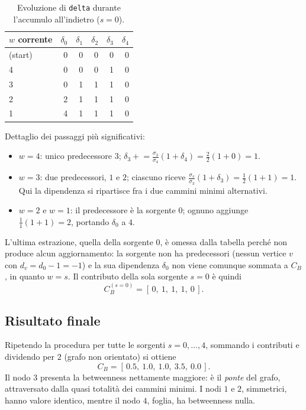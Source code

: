 \documentclass[11pt,a4paper]{report}
\begin{document}
\begin{table}[H]
	\centering
	\caption{Evoluzione di \texttt{delta} durante l'accumulo all'indietro ($s=0$).}
	\begin{tabular}{l rrrrr}
		\toprule
		$w$ corrente & $\delta_0$ & $\delta_1$ & $\delta_2$ & $\delta_3$ & $\delta_4$ \\
		\midrule
		(start)      & 0          & 0          & 0          & 0          & 0          \\
		4            & 0          & 0          & 0          & 1          & 0          \\
		3            & 0          & 1          & 1          & 1          & 0          \\
		2            & 2          & 1          & 1          & 1          & 0          \\
		1            & 4          & 1          & 1          & 1          & 0          \\
		\bottomrule
	\end{tabular}
\end{table}

Dettaglio dei passaggi più significativi:
\begin{itemize}
	\item \textbf{$w=4$}: unico predecessore $3$; $\delta_3 \mathrel{+}=
		      \frac{\sigma_3}{\sigma_4}(1+\delta_4)=\frac{2}{2}(1+0)=1$.
	\item \textbf{$w=3$}: due predecessori, $1$ e $2$; ciascuno riceve
	      $\frac{\sigma_v}{\sigma_3}(1+\delta_3)=\frac{1}{2}(1+1)=1$. Qui la
	      dipendenza si ripartisce fra i due cammini minimi alternativi.
	\item \textbf{$w=2$} e \textbf{$w=1$}: il predecessore è la sorgente $0$;
	      ognuno aggiunge $\frac{1}{1}(1+1)=2$, portando $\delta_0$ a $4$.
\end{itemize}

L'ultima estrazione, quella della sorgente $0$, è omessa dalla tabella perché non
produce alcun aggiornamento: la sorgente non ha predecessori (nessun vertice $v$
con $d_v = d_0-1 = -1$) e la sua dipendenza $\delta_0$ non viene comunque sommata a
$C_B$, in quanto $w=s$. Il contributo della sola sorgente $s=0$ è quindi
\[
	C_B^{(s=0)} = [\,0,\ 1,\ 1,\ 1,\ 0\,].
\]

\subsection*{Risultato finale}

Ripetendo la procedura per tutte le sorgenti $s=0,\dots,4$, sommando i contributi
e dividendo per $2$ (grafo non orientato) si ottiene
\[
	C_B = [\,0.5,\ 1.0,\ 1.0,\ 3.5,\ 0.0\,].
\]
Il nodo $3$ presenta la betweenness nettamente maggiore: è il \emph{ponte} del
grafo, attraversato dalla quasi totalità dei cammini minimi. I nodi $1$ e $2$,
simmetrici, hanno valore identico, mentre il nodo $4$, foglia, ha betweenness
nulla.
\end{document}

